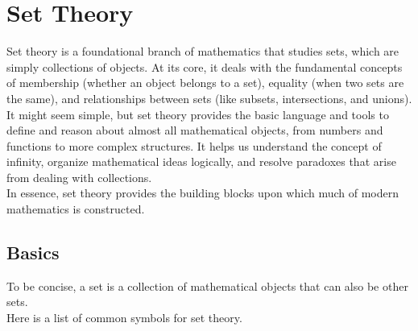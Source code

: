 \newpage
\section{Set Theory}

Set theory is a foundational branch of mathematics that studies sets, which are simply 
collections of objects. At its core, it deals with the fundamental concepts of membership 
(whether an object belongs to a set), equality (when two sets are the same), and relationships 
between sets (like subsets, intersections, and unions).\\
It might seem simple, but set theory provides the basic language and tools to define 
and reason about almost all mathematical objects, from numbers and functions to 
more complex structures. It helps us understand the concept of infinity, organize mathematical 
ideas logically, and resolve paradoxes that arise from dealing with collections.\\
In essence, set theory provides the building blocks upon which much of modern mathematics is constructed.

\subsection{Basics}
To be concise, a set is a collection of mathematical objects that can also be other sets.\\
Here is a list of common symbols for set theory.


